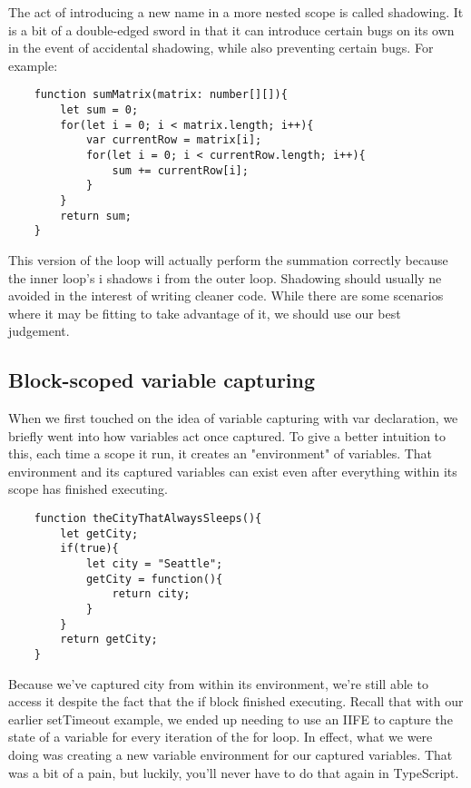 The act of introducing a new name in a more nested scope is called shadowing. It is a bit of a double-edged sword in that it can introduce certain bugs on its own in the event of accidental shadowing, while also preventing certain bugs. For example:

\begin{lstlisting}
    function sumMatrix(matrix: number[][]){
        let sum = 0;
        for(let i = 0; i < matrix.length; i++){
            var currentRow = matrix[i];
            for(let i = 0; i < currentRow.length; i++){
                sum += currentRow[i];
            }
        }
        return sum;
    }
\end{lstlisting}

This version of the loop will actually perform the summation correctly because the inner loop's i shadows i from the outer loop. Shadowing should usually ne avoided in the interest of writing cleaner code. While there are some scenarios where it may be fitting to take advantage of it, we should use our best judgement.

\subsection{Block-scoped variable capturing}
When we first touched on the idea of variable capturing with var declaration, we briefly went into how variables act once captured. To give a better intuition to this, each time a scope it run, it creates an "environment" of variables. That environment and its captured variables can exist even after everything within its scope has finished executing.

\begin{lstlisting}
    function theCityThatAlwaysSleeps(){
        let getCity;
        if(true){
            let city = "Seattle";
            getCity = function(){
                return city;
            }
        }
        return getCity;
    }
\end{lstlisting}

Because we've captured city from within its environment, we're still able to access it despite the fact that the if block finished executing. Recall that with our earlier setTimeout example, we ended up needing to use an IIFE to capture the state of a variable for every iteration of the for loop. In effect, what we were doing was creating a new variable environment for our captured variables. That was a bit of a pain, but luckily, you'll never have to do that again in TypeScript.

